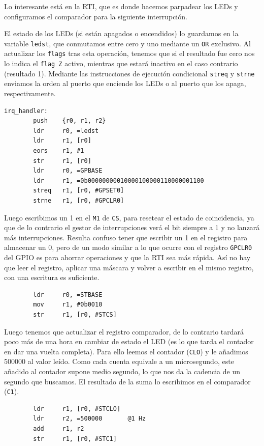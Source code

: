 Lo interesante está en la RTI, que es donde hacemos parpadear los LEDs y configuramos
el comparador para la siguiente interrupción.

El estado de los LEDs (si están apagados o encendidos) lo guardamos en la variable
{\tt ledst}, que conmutamos entre cero y uno mediante un {\tt OR} exclusivo. Al
actualizar los {\tt flags} tras esta operación, tenemos que si el resultado fue
cero nos lo indica el {\tt flag Z} activo, mientras que estará inactivo en el
caso contrario (resultado 1). Mediante las instrucciones de ejecución condicional
{\tt streq} y {\tt strne} enviamos la orden al puerto que enciende los LEDs o al
puerto que los apaga, respectivamente.

\begin{lstlisting}
irq_handler:
        push    {r0, r1, r2}
        ldr     r0, =ledst
        ldr     r1, [r0]
        eors    r1, #1
        str     r1, [r0]
        ldr     r0, =GPBASE
        ldr     r1, =0b00000000010000100000110000001100
        streq   r1, [r0, #GPSET0]
        strne   r1, [r0, #GPCLR0]
\end{lstlisting}


Luego escribimos un 1 en el {\tt M1} de {\tt CS}, para resetear el estado de coincidencia, ya
que de lo contrario el gestor de interrupciones verá el bit siempre a 1 y no lanzará más
interrupciones. Resulta confuso tener que escribir un 1 en el registro para almacenar un 0, pero
de un modo similar a lo que ocurre con el registro {\tt GPCLR0} del GPIO es para ahorrar
operaciones y que la RTI sea más rápida. Así no hay que leer el registro, aplicar una máscara y
volver a escribir en el mismo registro, con una escritura es suficiente.

\begin{lstlisting}
        ldr     r0, =STBASE
        mov     r1, #0b0010
        str     r1, [r0, #STCS]
\end{lstlisting}

Luego tenemos que actualizar el registro comparador, de lo contrario tardará poco más
de una hora en cambiar de estado el LED (es lo que tarda el contador en dar una vuelta
completa). Para ello leemos el contador ({\tt CLO}) y le añadimos 500000 al valor leído. Como cada
cuenta equivale a un microsegundo, este añadido al contador supone medio segundo, lo
que nos da la cadencia de un segundo que buscamos. El resultado de la suma lo escribimos
en el comparador ({\tt C1}).

\begin{lstlisting}
        ldr     r1, [r0, #STCLO]
        ldr     r2, =500000       @1 Hz
        add     r1, r2
        str     r1, [r0, #STC1]
\end{lstlisting}

